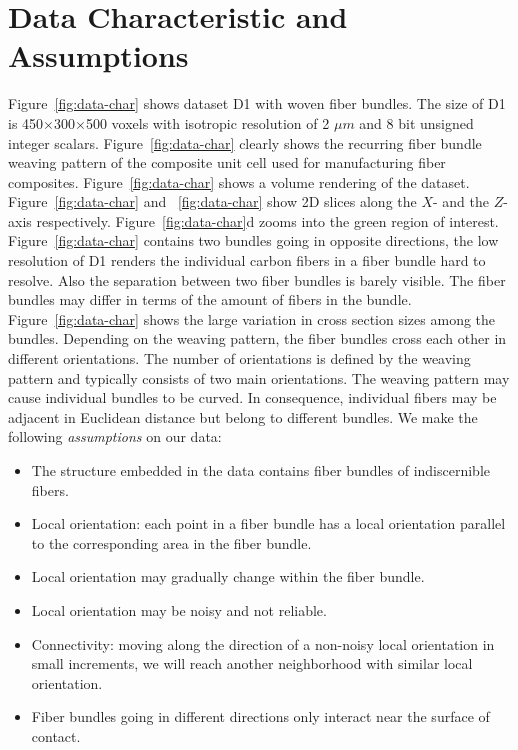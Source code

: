 \section {Data Characteristic and Assumptions}
\label{sec:char_data}
Figure~\ref{fig:data-char} shows dataset D1 with woven fiber bundles. The size of D1 is 450$\times$300$\times$500 voxels with isotropic resolution of 2 $\mu m$ and 8 bit unsigned integer scalars. Figure~\ref{fig:data-char} clearly shows the recurring fiber bundle weaving pattern of the composite unit cell used for manufacturing fiber composites. Figure~\ref{fig:data-char} shows a volume rendering of the dataset. Figure~\ref{fig:data-char} and ~\ref{fig:data-char} show 2D slices along the $X$- and the $Z$-axis respectively. Figure~\ref{fig:data-char}d zooms into the green region of interest. 
Figure~\ref{fig:data-char} contains two bundles going in opposite directions, the low resolution of D1 renders the individual carbon fibers in a fiber bundle hard to resolve. Also the separation between two fiber bundles is barely visible. The fiber bundles may differ in terms of the amount of fibers in the bundle. Figure~\ref{fig:data-char} shows the large variation in cross section sizes among the bundles.
Depending on the weaving pattern, the fiber bundles cross each other in different orientations. The number of orientations is defined by the weaving pattern and typically consists of two main orientations. The weaving pattern may cause individual bundles to be curved. In consequence, individual fibers may be adjacent in Euclidean distance but belong to different bundles. 
We make the following \textit{assumptions} on our data:

\begin{itemize}[noitemsep]
\item The structure embedded in the data contains fiber bundles of indiscernible fibers.
\item Local orientation: each point in a fiber bundle has a local orientation parallel to the corresponding area in the fiber bundle.
\item Local orientation may gradually change within the fiber bundle.
\item Local orientation may be noisy and not reliable.
\item Connectivity: moving along the direction of a non-noisy local orientation in small increments, we will reach another neighborhood with similar local orientation.
\item Fiber bundles going in different directions only interact near the surface of contact.
\end{itemize}